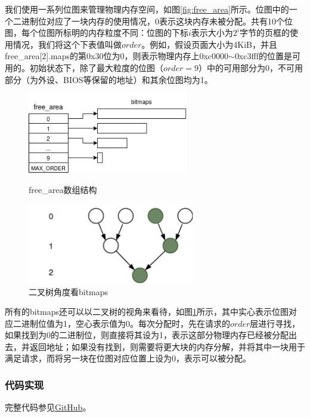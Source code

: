 \documentclass[UTF8,12pt]{ctexart}
\begin{document}
    我们使用一系列位图来管理物理内存空间，如图\ref{fig:free_area}所示。位图中的一个二进制位对应了一块内存的使用情况，0表示这块内存未被分配。共有10个位图，每个位图所标明的内存粒度不同：位图的下标$i$表示大小为$2^i$字节的页框的使用情况，我们将这个下表值叫做$order$。例如，假设页面大小为4KiB，并且free\_area[2].maps的第0x30位为0，则表示物理内存上0xc0000$\sim$0xc3fff的位置是可用的。初始状态下，除了最大粒度的位图（$order=9$）中的可用部分为0，不可用部分（为外设、BIOS等保留的地址）和其余位图均为1。
    
    \begin{figure}[H]
        \centering
        \begin{minipage}[t]{0.5\textwidth}
        \centering
        \includegraphics[height=3.5cm]{images/free_area.png}
        \caption{free\_area数组结构}
        \label{fig:free_area}
        \end{minipage}
        \begin{minipage}[t]{0.49\textwidth}
        \centering
        \includegraphics[height=3.5cm]{images/binary_tree.png}
        \caption{二叉树角度看bitmaps}
        \label{fig:binary_tree}
        \end{minipage}
    \end{figure}
    
    所有的bitmaps还可以以二叉树的视角来看待，如图\ref{fig:binary_tree}所示，其中实心表示位图对应二进制位值为1，空心表示值为0。每次分配时，先在请求的$order$层进行寻找，如果找到为0的二进制位，则直接将其设为1，表示这部分物理内存已经被分配出去，并返回地址；如果没有找到，则需要将更大块的内存分解，并将其中一块用于满足请求，而将另一块在位图对应位置上设为0，表示可以被分配。
    
    \subsubsection{代码实现}
    完整代码参见\href{https://www.github.com/xinyangli/orange-os}{GitHub}。
    
\end{document}
